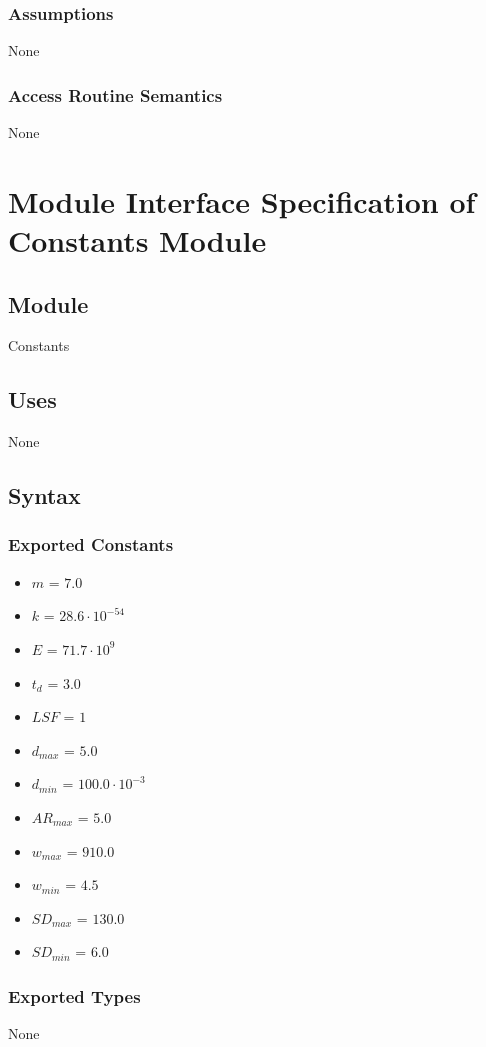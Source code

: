\documentclass[12pt]{article}
\begin{document}
\subsubsection{Assumptions}
\label{Sec:Assumps}
None
\subsubsection{Access Routine Semantics}
\label{Sec:AccRoutSemantics}
None
\section{Module Interface Specification of Constants Module}
\label{Sec:Constants}
\subsection{Module}
\label{Sec:Module}
Constants
\subsection{Uses}
\label{Sec:Uses}
None
\subsection{Syntax}
\label{Sec:Syntax}
\subsubsection{Exported Constants}
\label{Sec:ExpConstants}
\begin{itemize}
\item{$m$ = $7.0$}
\item{$k$ = $28.6\cdot{}10^{-54}$}
\item{$E$ = $71.7\cdot{}10^{9}$}
\item{${t_{d}}$ = $3.0$}
\item{$LSF$ = $1$}
\item{${d_{max}}$ = $5.0$}
\item{${d_{min}}$ = $100.0\cdot{}10^{-3}$}
\item{${AR_{max}}$ = $5.0$}
\item{${w_{max}}$ = $910.0$}
\item{${w_{min}}$ = $4.5$}
\item{${SD_{max}}$ = $130.0$}
\item{${SD_{min}}$ = $6.0$}
\end{itemize}
\subsubsection{Exported Types}
\label{Sec:ExpTypes}
None
\end{document}

